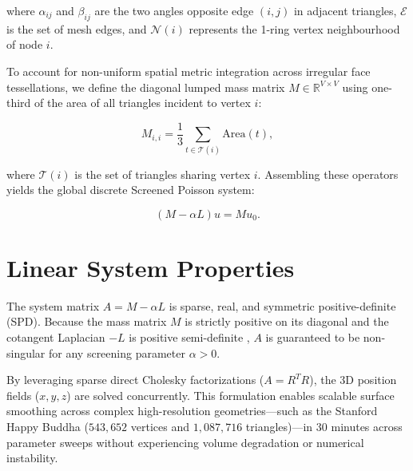 \documentclass[11pt,letterpaper]{article}
\begin{document}
\noindent where $\alpha_{ij}$ and $\beta_{ij}$ are the two angles opposite edge $(i, j)$ in adjacent triangles, $\mathcal{E}$ is the set of mesh edges, and $\mathcal{N}(i)$ represents the 1-ring vertex neighbourhood of node $i$. 

To account for non-uniform spatial metric integration across irregular face tessellations, we define the diagonal lumped mass matrix $M \in \mathbb{R}^{V \times V}$ using one-third of the area of all triangles incident to vertex $i$:

\begin{equation*}
M_{i,i} = \frac{1}{3} \sum_{t \in \mathcal{T}(i)} \text{Area}(t),
\end{equation*}

\noindent where $\mathcal{T}(i)$ is the set of triangles sharing vertex $i$. Assembling these operators yields the global discrete Screened Poisson system:

\begin{equation*}
(M - \alpha L) u = M u_0.
\end{equation*}

\section{Linear System Properties}

The system matrix $A = M - \alpha L$ is sparse, real, and symmetric positive-definite (SPD). Because the mass matrix $M$ is strictly positive on its diagonal and the cotangent Laplacian $-L$ is positive semi-definite , $A$ is guaranteed to be non-singular for any screening parameter $\alpha > 0$. 

By leveraging sparse direct Cholesky factorizations ($A = R^T R$), the 3D position fields ($x, y, z$) are solved concurrently. This formulation enables scalable surface smoothing across complex high-resolution geometries—such as the Stanford Happy Buddha ($543,652$ vertices and $1,087,716$ triangles)—in 30 minutes across parameter sweeps without experiencing volume degradation or numerical instability.
\end{document}
